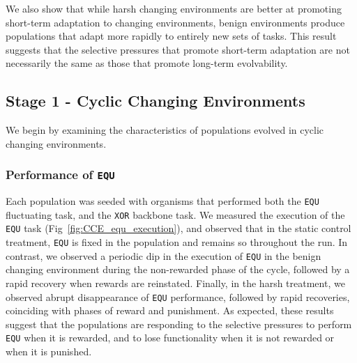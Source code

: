\documentclass[10pt,letterpaper,final]{article}
\begin{document}
We also show that while harsh changing environments are better at promoting short-term adaptation to changing environments, benign environments produce populations that adapt more rapidly to entirely new sets of tasks. This result suggests that the selective pressures that promote short-term adaptation are not necessarily the same as those that promote long-term evolvability.

\subsection*{Stage 1 - Cyclic Changing Environments}
We begin by examining the characteristics of populations evolved in cyclic changing environments.

\subsubsection*{Performance of \texttt{EQU}}
Each population was seeded with organisms that performed both the \texttt{EQU} fluctuating task, and the \texttt{XOR} backbone task. We measured the execution of the \texttt{EQU} task (Fig~\ref{fig:CCE_equ_execution}), and observed that in the static control treatment, \texttt{EQU} is fixed in the population and remains so throughout the run. In contrast, we observed a periodic dip in the execution of \texttt{EQU} in the benign changing environment during the non-rewarded phase of the cycle, followed by a rapid recovery when rewards are reinstated. Finally, in the harsh treatment, we observed abrupt disappearance of \texttt{EQU} performance, followed by rapid recoveries, coinciding with phases of reward and punishment. As expected, these results suggest that the populations are responding to the selective pressures to perform \texttt{EQU} when it is rewarded, and to lose functionality when it is not rewarded or when it is punished.
\end{document}
